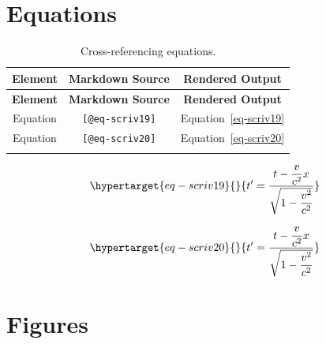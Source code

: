 \documentclass[
  12pt,
  a4paper,
  oneside,
  numbers=noenddot,
  titlepage,
  toclink=all,
  toc=bibliography]{scrbook}
\theoremstyle{definition}
\theoremstyle{definition}
\theoremstyle{definition}
\theoremstyle{plain}
\theoremstyle{plain}
\theoremstyle{plain}
\theoremstyle{plain}
\theoremstyle{plain}
\theoremstyle{remark}
\begin{document}
\newpage{}

\hypertarget{sec-scriv18}{%
\section{Equations}\label{sec-scriv18}}

\hypertarget{tbl-scriv18}{}
\begin{longtable}[]{@{}ccc@{}}
\toprule\noalign{}
\textbf{Element} & \textbf{Markdown Source} & \textbf{Rendered
Output} \\
\midrule\noalign{}
\endfirsthead
\toprule\noalign{}
\textbf{Element} & \textbf{Markdown Source} & \textbf{Rendered
Output} \\
\midrule\noalign{}
\endhead
\bottomrule\noalign{}
\endlastfoot
Equation & \texttt{{[}@eq-scriv19{]}} &
\protect\hypertarget{cite_73}{}{\label{cite_73}Equation~\ref{eq-scriv19}} \\
Equation & \texttt{{[}@eq-scriv20{]}} &
\protect\hypertarget{cite_74}{}{\label{cite_74}Equation~\ref{eq-scriv20}} \\
\caption{\label{tbl-scriv18}Cross-referencing equations.}\tabularnewline
\end{longtable}

\begin{equation}\protect\hypertarget{eq-scriv19}{}{t' = \frac{t - \dfrac{v}{c^{2}}x}{\sqrt{1 - \dfrac{v^{2}}{c^{2}}}}}\label{eq-scriv19}\end{equation}

\begin{equation}\protect\hypertarget{eq-scriv20}{}{t' = \frac{t - \dfrac{v}{c^{2}}x}{\sqrt{1 - \dfrac{v^{2}}{c^{2}}}}
}\label{eq-scriv20}\end{equation}

\newpage{}

\hypertarget{sec-scriv21}{%
\section{Figures}\label{sec-scriv21}}

\end{document}
